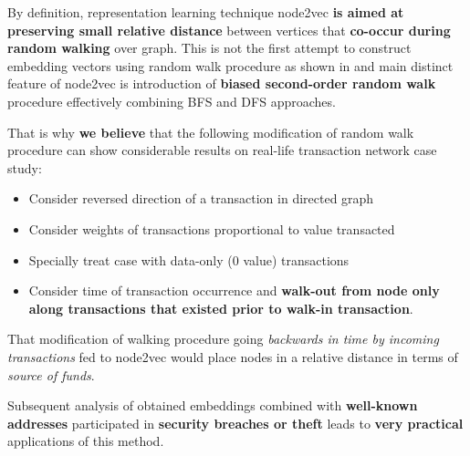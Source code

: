 By definition, representation learning technique node2vec \textbf{is aimed at preserving small relative distance} between vertices that \textbf{co-occur during random walking} over graph. This is not the first attempt to construct embedding vectors using random walk procedure as shown in \cite{DBLP:journals/corr/abs-1709-05584} and main distinct feature of node2vec is introduction of \textbf{biased second-order random walk} procedure effectively combining BFS and DFS approaches.

That is why \textbf{we believe} that the following modification of random walk procedure can show considerable results on real-life transaction network case study:
\begin{itemize}
    \item Consider reversed direction of a transaction in directed graph
    \item Consider weights of transactions proportional to value transacted 
    \item Specially treat case with data-only (0 value) transactions
    \item Consider time of transaction occurrence and \textbf{walk-out from node only along transactions that existed prior to walk-in transaction}.
\end{itemize}

That modification of walking procedure going \textit{backwards in time by incoming transactions} fed to node2vec would place nodes in a relative distance in terms of \textit{source of funds}. 

Subsequent analysis of obtained embeddings combined with \textbf{well-known addresses} participated in \textbf{security breaches or theft} leads to \textbf{very practical} applications of this method.

